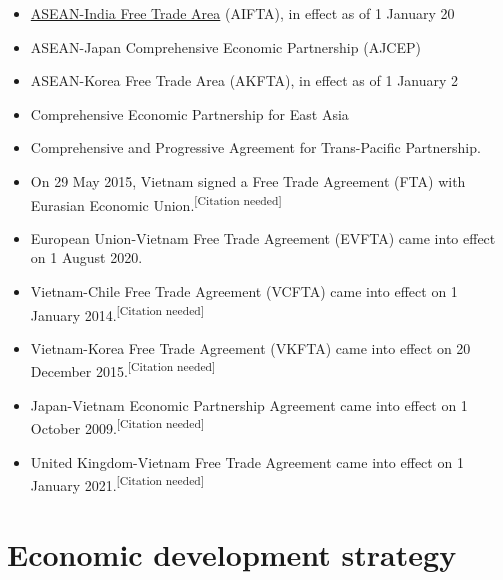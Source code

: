 \documentclass[openany]{book}
\begin{document}
    \begin{itemize}
        \vspace{-5pt}
                \item \href{https://en.wikipedia.org/wiki/ASEAN%E2%80%93India_Free_Trade_Area}{ASEAN-India Free Trade Area} (AIFTA), in effect as of 1 January 20\-10\cite{129}
                \item ASEAN-Japan Comprehensive Economic Partnership (AJCEP)
                \item ASEAN-Korea Free Trade Area (AKFTA), in effect as of 1 J\-a\-n\-u\-a\-r\-y 2\cite{129}
                \item Comprehensive Economic Partnership for East Asia
                \item Comprehensive and Progressive Agreement for Trans-Pacific Partnership.
                \item On 29 May 2015, Vietnam signed a Free Trade Agreement (FTA) with Eurasian Economic Union.\textsuperscript{[Citation needed]}
                \item European Union-Vietnam Free Trade Agreement (EVFTA) came into effect on 1 August 2020.
                \item Vietnam-Chile Free Trade Agreement (VCFTA) came into effect on 1 January 2014.\textsuperscript{[Citation needed]}
                \item Vietnam-Korea Free Trade Agreement (VKFTA) came into effect on 20 December 2015.\textsuperscript{[Citation needed]}
                \item Japan-Vietnam Economic Partnership Agreement came into effect on 1 October 2009.\textsuperscript{[Citation needed]}
                \item United Kingdom-Vietnam Free Trade Agreement came into effect on 1 January 2021.\textsuperscript{[Citation needed]}
    \end{itemize}    




\chapter{Economic development strategy}
\end{document}
